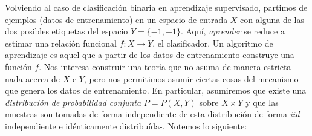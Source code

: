 \documentclass{report}
\begin{document}
Volviendo al caso de clasificación binaria en aprendizaje supervisado, partimos de ejemplos (datos de entrenamiento) 
en un espacio de entrada $X$ con alguna de las dos posibles etiquetas del espacio $Y=\{-1,+1\}$. Aquí, \textit{aprender}
se reduce a estimar una relación funcional $f:X\rightarrow Y$, el clasificador. Un algoritmo de aprendizaje es aquel
que a partir de los datos de entrenamiento construye una función $f$. Nos interesa construir una teoría que no asuma
de manera estricta nada acerca de $X$ e $Y$, pero nos permitimos asumir ciertas cosas del mecanismo que genera los
datos de entrenamiento. En particular, asumiremos que existe una \textit{distribución de probabilidad conjunta} $P=P(X,Y)$
sobre $X\times Y$ y que las muestras son tomadas de forma independiente de esta distribución de forma \textit{iid} -independiente
e idénticamente distribuída-. Notemos lo siguiente:
\end{document}
